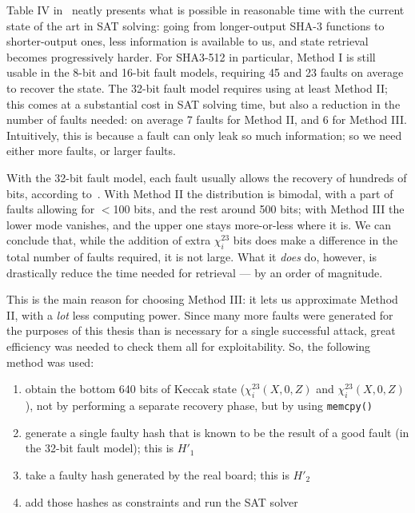 \documentclass[times, utf8, diplomski]{fer}
\begin{document}
Table IV in~\cite{luo2018algebraic} neatly presents what is possible in
reasonable time with the current state of the art in SAT solving: going from
longer-output SHA-3 functions to shorter-output ones, less information is
available to us, and state retrieval becomes progressively harder.
For SHA3-512 in particular, Method I is still usable in the 8-bit and 16-bit
fault models, requiring 45 and 23 faults on average to recover the state.
The 32-bit fault model requires using at least Method II; this comes at a
substantial cost in SAT solving time, but also a reduction in the number of
faults needed: on average 7 faults for Method II, and 6 for Method III.
Intuitively, this is because a fault can only leak so much information;
so we need either more faults, or larger faults.

With the 32-bit fault model, each fault usually allows the recovery of hundreds
of bits, according to~\cite{luo2018algebraic}. With Method II the distribution
is bimodal, with a part of faults allowing for $<$100 bits, and the rest around
500 bits; with Method III the lower mode vanishes, and the upper one stays
more-or-less where it is. We can conclude that, while the addition of extra
$\chi^{23}_i$ bits does make a difference in the total number of faults required,
it is not large. What it \emph{does} do, however, is drastically reduce the time
needed for retrieval --- by an order of magnitude.

This is the main reason for choosing Method III: it lets us approximate Method II,
with a \emph{lot} less computing power.
Since many more faults were generated for the purposes of this thesis than is
necessary for a single successful attack, great efficiency was needed to check
them all for exploitability.
So, the following method was used:
\begin{enumerate}
    \item obtain the bottom 640 bits of Keccak state ($\chi^{23}_i(X,0,Z)$
          and $\chi^{23}_i(X,0,Z)$), not by performing a separate recovery
          phase, but by using \texttt{memcpy()}
    \item generate a single faulty hash that is known to be the result of a
          good fault (in the 32-bit fault model); this is $H'_1$
    \item take a faulty hash generated by the real board; this is $H'_2$
    \item add those hashes as constraints and run the SAT solver
\end{enumerate}
\end{document}

